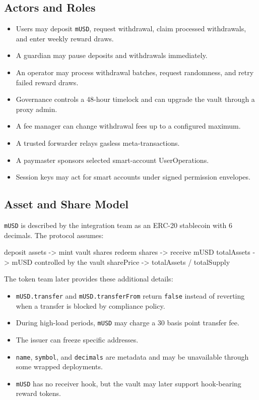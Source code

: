 \subsection*{Actors and Roles}

\begin{itemize}
\item Users may deposit \texttt{mUSD}, request withdrawal, claim processed withdrawals, and enter weekly reward draws.
\item A guardian may pause deposits and withdrawals immediately.
\item An operator may process withdrawal batches, request randomness, and retry failed reward draws.
\item Governance controls a 48-hour timelock and can upgrade the vault through a proxy admin.
\item A fee manager can change withdrawal fees up to a configured maximum.
\item A trusted forwarder relays gasless meta-transactions.
\item A paymaster sponsors selected smart-account UserOperations.
\item Session keys may act for smart accounts under signed permission envelopes.
\end{itemize}

\subsection*{Asset and Share Model}

\texttt{mUSD} is described by the integration team as an ERC-20 stablecoin with 6 decimals. The protocol assumes:

\begin{codeblock}
deposit assets -> mint vault shares
redeem shares  -> receive mUSD
totalAssets    -> mUSD controlled by the vault
sharePrice     -> totalAssets / totalSupply
\end{codeblock}

The token team later provides these additional details:

\begin{itemize}
\item \texttt{mUSD.transfer} and \texttt{mUSD.transferFrom} return \texttt{false} instead of reverting when a transfer is blocked by compliance policy.
\item During high-load periods, \texttt{mUSD} may charge a 30 basis point transfer fee.
\item The issuer can freeze specific addresses.
\item \texttt{name}, \texttt{symbol}, and \texttt{decimals} are metadata and may be unavailable through some wrapped deployments.
\item \texttt{mUSD} has no receiver hook, but the vault may later support hook-bearing reward tokens.
\end{itemize}

